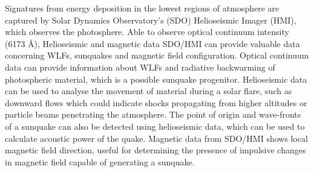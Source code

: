 Signatures from energy deposition in the lowest regions of atmosphere are captured by Solar Dynamics Observatory's (SDO) Helioseismic Imager (HMI), which observes the photosphere. Able to observe optical continuum intensity (6173 \AA), Helioseismic and magnetic data SDO/HMI can provide valuable data concerning WLFs, sunquakes and magnetic field configuration. Optical continuum data can provide information about WLFs and radiative backwarming of photospheric material, which is a possible sunquake progenitor. Helioseismic data can be used to analyse the movement of material during a solar flare, such as downward flows which could indicate shocks propagating from higher altitudes or particle beams penetrating the atmosphere. The point of origin and wave-fronts of a sunquake can also be detected using helioseismic data, which can be used to calculate acoustic power of the quake. Magnetic data from SDO/HMI shows local magnetic field direction, useful for determining the presence of impulsive changes in magnetic field capable of generating a sunquake.     




